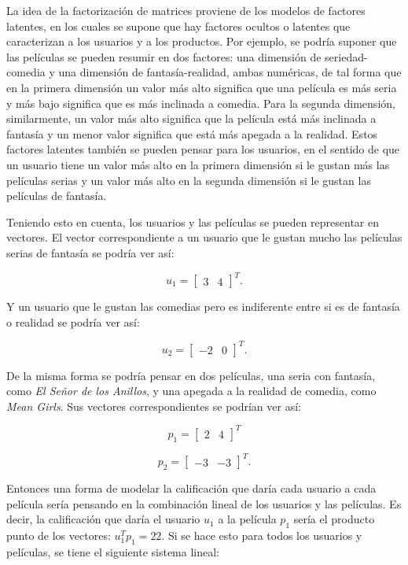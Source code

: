 La idea de la factorización de matrices proviene de los modelos de factores latentes, en los cuales se supone que hay factores ocultos o latentes que caracterizan a los usuarios y a los productos. Por ejemplo, se podría suponer que las películas se pueden resumir en dos factores: una dimensión de seriedad-comedia y una dimensión de fantasía-realidad, ambas numéricas, de tal forma que en la primera dimensión un valor más alto significa que una película es más seria y más bajo significa que es más inclinada a comedia. Para la segunda dimensión, similarmente, un valor más alto significa que la película está más inclinada a fantasía y un menor valor significa que está más apegada a la realidad. Estos factores latentes también se pueden pensar para los usuarios, en el sentido de que un usuario tiene un valor más alto en la primera dimensión si le gustan más las películas serias y un valor más alto en la segunda dimensión si le gustan las películas de fantasía.

Teniendo esto en cuenta, los usuarios y las películas se pueden representar en vectores. El vector correspondiente a un usuario que le gustan mucho las películas serias de fantasía se podría ver así:

\[
     u_1 = 
    \begin{bmatrix}
        3 & 4
    \end{bmatrix}^{T}.
\]
  
Y un usuario que le gustan las comedias pero es indiferente entre si es de fantasía o realidad se podría ver así:

\[
     u_2 = 
     \begin{bmatrix}
         -2 & 0
    \end{bmatrix}^{T}.
\]
  
De la misma forma se podría pensar en dos películas, una seria con fantasía, como \textit{El Señor de los Anillos}, y una apegada a la realidad de comedia, como \textit{Mean Girls}. Sus vectores correspondientes se podrían ver así:

\[
    p_1 = 
    \begin{bmatrix}
         2 & 4
    \end{bmatrix}^{T}
\]


\[
    p_2 = 
    \begin{bmatrix}
         -3 & -3
    \end{bmatrix}^{T}.
\]

Entonces una forma de modelar la calificación que daría cada usuario a cada película sería pensando en la combinación lineal de los usuarios y las películas. Es decir, la calificación que daría el usuario $u_1$ a la película $p_1$ sería el producto punto de los vectores: $u_1^T p_1 = 22$. Si se hace esto para todos los usuarios y películas, se tiene el siguiente sistema lineal:

